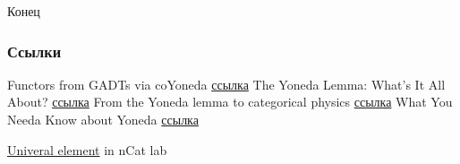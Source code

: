 \documentclass[
  russian,
  aspectratio=169,
  xcolor={svgnames},
  hyperref={colorlinks,citecolor=DeepPink4,linkcolor=DarkRed,urlcolor=DarkBlue}]{beamer}
\begin{document}
\begin{frame}[fragile]

 \begin{center}
  \Huge Конец
 \end{center}
\end{frame}

\begin{frame}[allowframebreaks]
  \frametitle<presentation>{Ссылки}
  \begin{thebibliography}{10}
  \beamertemplatebookbibitems
    Functors from GADTs via coYoneda
    \newblock \href{http://www.haskellforall.com/2012/06/gadts.html}{ссылка}
   \bibitem{}
    The Yoneda Lemma: What’s It All About? 
    \newblock \href{http://www.maths.ed.ac.uk/~tl/categories/yoneda.ps}{ссылка}
   \bibitem{}
    From the Yoneda lemma to categorical physics
    \newblock \href{https://www.classe.cornell.edu/spr/1999-09/msg0017972.html}{ссылка}
  \bibitem{}
    What You Needa Know about Yoneda
    \newblock \href{https://www.cs.ox.ac.uk/jeremy.gibbons/publications/proyo.pdf}{ссылка}

  \bibitem{}
    \href{https://ncatlab.org/nlab/show/universal\%20element}{Univeral element} in nCat lab



 \end{thebibliography}
\end{frame}
\end{document}
